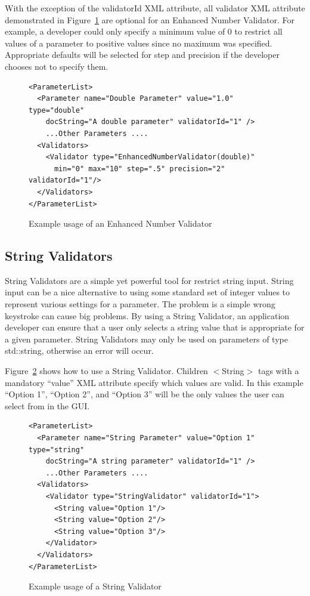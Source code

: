 With the exception of the validatorId XML attribute, all validator XML attribute demonstrated in Figure~\ref{EnhancedNumberValidatorXML}
are optional for an Enhanced Number Validator. For example, a developer could only specify a minimum value of 0 to restrict all 
values of a parameter to positive values since no maximum was specified.
Appropriate defaults will be selected for step and precision if the developer chooses not to specify them.
\begin{figure}
\centering
{\footnotesize
\begin{verbatim}
<ParameterList>
  <Parameter name="Double Parameter" value="1.0" type="double" 
    docString="A double parameter" validatorId="1" />
    ...Other Parameters ....
  <Validators>
    <Validator type="EnhancedNumberValidator(double)" 
      min="0" max="10" step=".5" precision="2" validatorId="1"/>
  </Validators>
</ParameterList>
\end{verbatim}
}
\caption{Example usage of an Enhanced Number Validator}
\label{EnhancedNumberValidatorXML}
\end{figure}

\subsection{String Validators}
String Validators are a simple yet powerful tool for restrict string input. String input can be a nice alternative to
using some standard set of integer values to represent various settings for a parameter. The problem is a simple wrong 
keystroke can cause big problems. By using a String Validator, an application developer can ensure that a user 
only selects a string value that is appropriate for a given parameter. 
String Validators may only be used on parameters of type std::string, otherwise an error will occur.

Figure~\ref{StringValidatorXML} shows how to use a String Validator. Children $<$String$>$ tags with a mandatory ``value'' XML attribute specify which values are 
valid.  In this example ``Option 1'', ``Option 2'', and ``Option 3'' will be the only values the user can select from in the GUI.
\begin{figure}
\centering
{\footnotesize
\begin{verbatim}
<ParameterList>
  <Parameter name="String Parameter" value="Option 1" type="string" 
    docString="A string parameter" validatorId="1" />
    ...Other Parameters ....
  <Validators>
    <Validator type="StringValidator" validatorId="1">
      <String value="Option 1"/> 
      <String value="Option 2"/> 
      <String value="Option 3"/> 
    </Validator>
  </Validators>
</ParameterList>
\end{verbatim}
}
\caption{Example usage of a String Validator}
\label{StringValidatorXML}
\end{figure}

